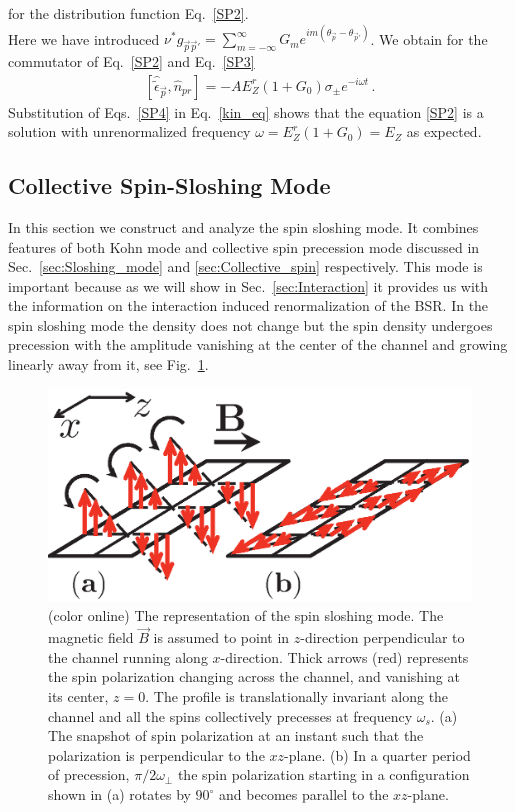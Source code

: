 for the distribution function Eq.~\eqref{SP2}.\\
 Here we have introduced $\nu^* g_{\vec{p}\vec{p}'} = \sum_{m=-\infty}^{\infty} G_m e^{i m (\theta_{\vec{p}}-\theta_{\vec{p}'})}$.
We obtain for the commutator of Eq.~\eqref{SP2} and Eq.~\eqref{SP3}
\begin{align}\label{SP4}
[\hat{\tilde{\epsilon}}_{\vec{p}},\hat{n}_{pr}] = -A E_Z^r (1 + G_0) \sigma_{\pm} e^{-i \omega t}\, .
\end{align}
Substitution of Eqs.~\eqref{SP4} in Eq.~\eqref{kin_eq} shows that the equation \eqref{SP2} is a solution with unrenormalized frequency $\omega = E_Z^r (1 + G_0) = E_Z$ as expected.
\subsection{Collective Spin-Sloshing Mode}
\label{sec:Collective_spin-sloshing}
In this section we construct and analyze the spin sloshing mode.
It combines features of both Kohn mode and collective spin precession mode discussed in Sec.~\ref{sec:Sloshing_mode} and \ref{sec:Collective_spin} respectively.
This mode is important because as we will show in Sec.~\ref{sec:Interaction} it provides us with the information on the interaction induced renormalization of the BSR.
In the spin sloshing mode the density does not change but the spin density undergoes precession with the amplitude vanishing at the center of the channel and growing linearly away from it, see Fig.~\ref{fig:slosh}.

\begin{figure}[ht!]
\begin{center}
\includegraphics[width=0.5\columnwidth]{fig3.eps}
\caption{ (color online) The representation of the spin sloshing mode.
The magnetic field $\vec{B}$ is assumed to point in $z$-direction perpendicular to the channel running along $x$-direction. 
Thick arrows (red) represents the spin polarization changing across the channel, and vanishing at its center, $z=0$.
The profile is translationally invariant along the channel and all the spins collectively precesses at frequency $\omega_s$.
(a) The snapshot of spin polarization at an instant such that the polarization is perpendicular to the $xz$-plane.
(b) In a quarter period of precession, $\pi/2 \omega_{\perp}$ the spin polarization starting in a configuration shown in (a) rotates by $90^{\circ}$ and becomes parallel to the $xz$-plane.\cite{Iqbal}}
\label{fig:slosh}
\end{center}
\end{figure}






